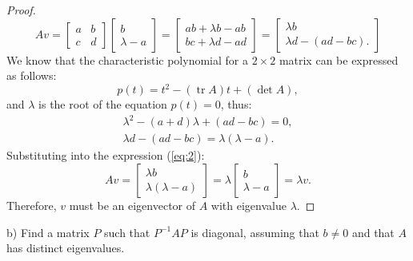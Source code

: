 \documentclass{article}
\theoremstyle{definition}
\newcommand{\trace}{\operatorname{tr}}
\begin{document}
\begin{proof}
\begin{equation} \label{eq:2}
    Av =
    \begin{bmatrix}
    a & b \\
    c & d
    \end{bmatrix}
    \begin{bmatrix}
        b \\
        \lambda - a
    \end{bmatrix}
    =
    \begin{bmatrix}
        ab + \lambda b - ab \\
        bc + \lambda d - ad
    \end{bmatrix}
    = 
    \begin{bmatrix}
        \lambda b \\
        \lambda d - (ad-bc).
    \end{bmatrix}
\end{equation}
We know that the characteristic polynomial for a $2 \times 2$ matrix can be expressed as follows:
\[ p(t) = t^2 - (\trace A)t + (\det A), \]
and $\lambda$ is the root of the equation $p(t) = 0$, thus:
\begin{gather*}
    \lambda^2 - (a+d)\lambda + (ad-bc) = 0, \\
    \lambda d - (ad-bc) = \lambda (\lambda - a). 
\end{gather*}
Substituting into the expression (\ref{eq:2}):
\[
    Av = 
    \begin{bmatrix}
        \lambda b \\
        \lambda (\lambda - a)
    \end{bmatrix}
    =
    \lambda
    \begin{bmatrix}
        b \\
        \lambda - a
    \end{bmatrix}
    = \lambda v.
\]
Therefore, $v$ must be an eigenvector of $A$ with eigenvalue $\lambda$.

\end{proof}

\begin{tcolorbox}
b) Find a matrix $P$ such that $P^{-1}AP$ is diagonal, assuming that $b \neq 0$ and that $A$ has distinct eigenvalues.
\end{tcolorbox}
\end{document}

